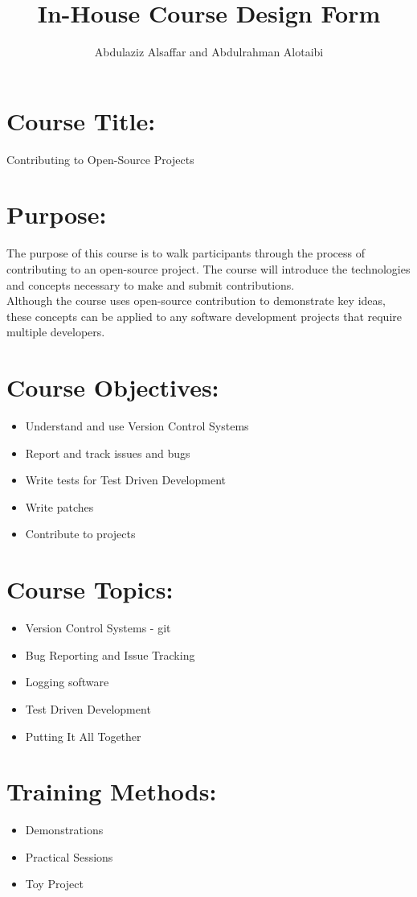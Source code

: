 \documentclass[a4paper,11pt]{article}
\author{Abdulaziz Alsa{f}far and Abdulrahman Alotaibi}
\title{In-House Course Design Form}
\begin{document}
\maketitle
\pagestyle{plain}
\setcounter{page}{1}

\section{Course Title:}
Contributing to Open-Source Projects
\section{Purpose:}
The purpose of this course is to walk participants through the process of contributing to an open-source project.
The course will introduce the technologies and concepts necessary to make and submit contributions.\\
Although the course uses open-source contribution to demonstrate key ideas, these concepts can be applied to any software development projects that require multiple developers.

\section{Course Objectives:}
\begin{itemize}
	\item Understand and use Version Control Systems
	\item Report and track issues and bugs
	\item Write tests for Test Driven Development
	\item Write patches
	\item Contribute to projects
\end{itemize}

\section{Course Topics:}
\begin{itemize}
	\item Version Control Systems - git
	\item Bug Reporting and Issue Tracking
    \item Logging software
	\item Test Driven Development
	\item Putting It All Together
\end{itemize}

\section{Training Methods:}
\begin{itemize}
	\item Demonstrations
	\item Practical Sessions
	\item Toy Project
\end{itemize}
\end{document}
